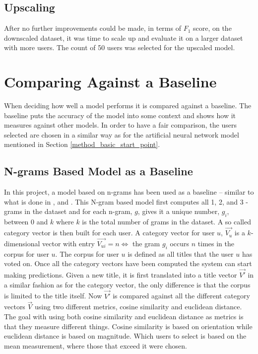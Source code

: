 \subsection{Upscaling}
After no further improvements could be made, in terms of $F_1$ score, on the downscaled dataset, it was time to scale up and evaluate it on a larger dataset with more users. The count of 50 users was selected for the upscaled model. 

\section{Comparing Against a Baseline}
When deciding how well a model performs it is compared against a baseline. The baseline puts the accuracy of the model into some context and shows how it measures against other models. In order to have a fair comparison, the users selected are chosen in a similar way as for the artificial neural network model mentioned in Section \ref{method_basic_start_point}. 

\subsection{N-grams Based Model as a Baseline}
In this project, a model based on n-grams \parencite{cavnar1994n} has been used as a baseline -- similar to what is done in \parencite{miao2005document}, and \parencite{khabiacluster}. This N-gram based model first computes all 1, 2, and 3 -grams in the dataset and for each n-gram, $g$, gives it a unique number, $g_i$, between $0$ and $k$ where $k$ is the total number of grams in the dataset. A so called category vector is then built for each user. A category vector for user $u$, $\vec{V_u}$ is a $k$-dimensional vector with entry $\vec{V_{ui}} = n \iff $ the gram $g_i$ occurs $n$ times in the corpus for user $u$. The corpus for user $u$ is defined as all titles that the user $u$ has voted on. Once all the category vectors have been computed the system can start making predictions. Given a new title, it is first translated into a title vector $\vec{V'}$ in a similar fashion as for the category vector, the only difference is that the corpus is limited to the title itself. Now $\vec{V'}$ is compared against all the different category vectors $\vec{V}$ using two different metrics, cosine similarity \parencite{steinbach2000comparison} and euclidean distance. The goal with using both cosine similarity and euclidean distance as metrics is that they measure different things. Cosine similarity is based on orientation while euclidean distance is based on magnitude. Which users to select is based on the mean measurement, where those that exceed it were chosen. 

